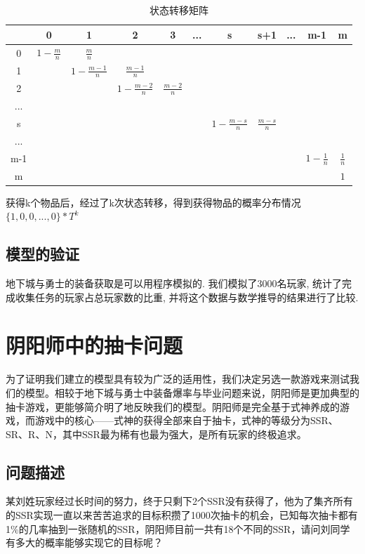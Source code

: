 \documentclass[10pt,journal,compsoc]{IEEEtran}
\begin{document}
  \begin{table}[]
    \centering
    \caption{状态转移矩阵}
    \label{Markov}
    \begin{tabular}{c|cccccccccc}
        & 0 & 1 & 2 & 3 & ... & s & s+1 & ... & m-1 & m \\ \hline
    0   & $1-\frac{m}{n}$ & $\frac{m}{n}$ &   &   &     &   &     &     &     &   \\
    1   &   & $1-\frac{m-1}{n}$ & $\frac{m-1}{n}$ &   &     &   &     &     &     &   \\
    2   &   &   & $1-\frac{m-2}{n}$ & $\frac{m-2}{n}$ &     &   &     &     &     &   \\
    ... &   &   &   &   &     &   &     &     &     &   \\
    s   &   &   &   &   &     & $1-\frac{m-s}{n}$ & $\frac{m-s}{n}$ &     &     &   \\
    ... &   &   &   &   &     &   &     &     &     &   \\
    m-1 &   &   &   &   &     &   &     &     &  $1-\frac{1}{n}$  & $\frac{1}{n}$ \\
    m   &   &   &   &   &     &   &     &     &     &  $1$
    \end{tabular}
  \end{table}
  
  获得k个物品后，经过了k次状态转移，得到获得物品的概率分布情况$\{1,0,0,...,0\}*T^k$



  \subsection{模型的验证}
    地下城与勇士的装备获取是可以用程序模拟的. 我们模拟了3000名玩家, 统计了完成收集任务的玩家占总玩家数的比重, 并将这个数据与数学推导的结果进行了比较. 



\section{阴阳师中的抽卡问题}
为了证明我们建立的模型具有较为广泛的适用性，我们决定另选一款游戏来测试我们的模型。相较于地下城与勇士中装备爆率与毕业问题来说，阴阳师是更加典型的抽卡游戏，更能够简介明了地反映我们的模型。阴阳师是完全基于式神养成的游戏，而游戏中的核心——式神的获得全部来自于抽卡，式神的等级分为SSR、SR、R、N，其中SSR最为稀有也最为强大，是所有玩家的终极追求。

\subsection{问题描述}
某刘姓玩家经过长时间的努力，终于只剩下2个SSR没有获得了，他为了集齐所有的SSR实现一直以来苦苦追求的目标积攒了1000次抽卡的机会，已知每次抽卡都有1\%的几率抽到一张随机的SSR，阴阳师目前一共有18个不同的SSR，请问刘同学有多大的概率能够实现它的目标呢？
\end{document}
